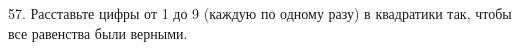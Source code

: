 57. Расставьте цифры от 1 до 9 (каждую по одному разу) в квадратики так, чтобы все равенства были верными.
\begin{center}
\begin{figure}[ht!]
\end{figure}
\end{center}
